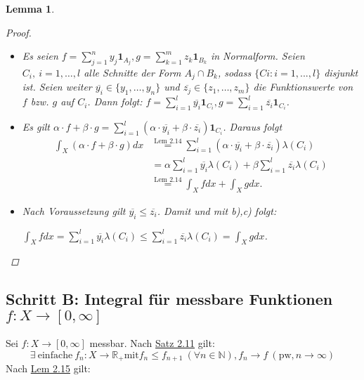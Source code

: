 \documentclass[a4paper]{report}
\newcommand{\doubleOne}{\textbf{1}}
\newcommand{\R}{\mathbb{R}}
\newcommand{\N}{\mathbb{N}}
\newcommand{\toInf}{\rightarrow \infty}
\newcommand{\jlabel}[1]{\label{j_#1}}
\newcommand{\jshortlink}[1]{\jhyperref{#1}{\text{#1}}}
\newcommand{\jhyperref}[2]{\hyperref[j_#1]{#2}}
\newcommand{\jlink}[1]{\jhyperref{#1}{#1}}
\theoremstyle{plain}
\newtheorem{lem}[thm]{Lemma}
\theoremstyle{definition}
\begin{document}
{{{\begin{lem}
\begin{proof}
\begin{itemize}
            \item[b),c):]
                Es seien $f = \sum_{j=1}^n y_j \doubleOne_{A_j}, g = \sum_{k=1}^m z_k \doubleOne_{B_k}$ in Normalform.
                Seien $C_i,\ i = 1,\dots,l$ alle Schnitte der Form $A_j \cap B_k$, sodass $\{Ci : i = 1,...,l\}$ disjunkt ist.
                Seien weiter $\overline{y_i} \in \{y_1, \dots, y_n\}$ und $\overline{z_j} \in \{z_1, \dots, z_m\}$ die Funktionswerte von $f$ bzw. $g$ auf $C_i$. Dann folgt: $f = \sum_{i=1}^l \overline{y_i} \doubleOne_{C_i}, g = \sum_{i=1}^l \overline{z_i} \doubleOne_{C_i}$.
                
            \item[b):]
                Es gilt $\alpha\cdot f + \beta\cdot g = \sum_{i=1}^l (\alpha\cdot \overline{y_i} + \beta\cdot \overline{z_i})\doubleOne_{C_i}$.
                Daraus folgt
                \begin{displaymath}
                    \begin{split}
                        \int_X (\alpha\cdot f + \beta\cdot g)dx &\overset{\jshortlink{Lem 2.14}}{=} \sum_{i=1}^l(\alpha\cdot \overline{y_i} + \beta\cdot \overline{z_i})\lambda(C_i)\\
                        &= \alpha \sum_{i=1}^l \overline{y_i} \lambda(C_i) + \beta \sum_{i=1}^l \overline{z_i} \lambda(C_i)\\
                        &\overset{\jshortlink{Lem 2.14}}{=} \int_X f dx + \int_X g dx.
                    \end{split}
                \end{displaymath}
            \item[c):]
                Nach Voraussetzung gilt $\overline{y_i} \le \overline{z_i}$. Damit und mit b),c) folgt:
                
                $\int_X f dx = \sum_{i=1}^l \overline{y_i} \lambda(C_i) \le \sum_{i=1}^l \overline{z_i} \lambda(C_i) = \int_X g dx$.
        \end{itemize}
    \end{proof}
\end{lem}

\subsection*{Schritt B: Integral für messbare Funktionen $f: X \rightarrow [0, \infty]$}

Sei $f: X \rightarrow [0, \infty]$ messbar. Nach \jlink{Satz 2.11} gilt:
\jlabel{(2.2)}
\begin{equation}
    \exists \ \text{einfache} \ f_n: X \rightarrow \R_+ \text{mit} f_n \le f_{n+1} \ (\forall n \in \N), f_n \rightarrow f \  (\text{pw}, n \toInf)
\end{equation} 
Nach \jlink{Lem 2.15} gilt:

}}}
\end{document}
